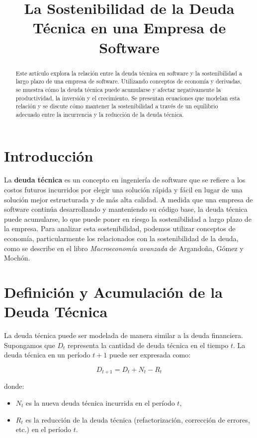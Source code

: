 \documentclass[12pt]{article}
\title{La Sostenibilidad de la Deuda Técnica en una Empresa de Software}
\author{}
\date{}
\begin{document}
\maketitle

\tableofcontents %
\newpage %


\begin{abstract}
Este artículo explora la relación entre la deuda técnica en software y la sostenibilidad a largo plazo de una empresa de software. 
Utilizando conceptos de economía y derivadas, se muestra cómo la deuda técnica puede acumularse 
y afectar negativamente la productividad, la inversión y el crecimiento. 
Se presentan ecuaciones que modelan esta relación y se discute cómo mantener la sostenibilidad 
a través de un equilibrio adecuado entre la incurrencia y la reducción de la deuda técnica.
\end{abstract}

\section{Introducción}
La \textbf{deuda técnica} es un concepto en ingeniería de software que se refiere a los costos futuros incurridos por elegir una solución rápida y fácil en lugar de una solución mejor estructurada y de más alta calidad. A medida que una empresa de software continúa desarrollando y manteniendo su código base, la deuda técnica puede acumularse, lo que puede poner en riesgo la sostenibilidad a largo plazo de la empresa. Para analizar esta sostenibilidad, podemos utilizar conceptos de economía, particularmente los relacionados con la sostenibilidad de la deuda, como se describe en el libro \textit{Macroeconomía avanzada} de Argandoña, Gómez y Mochón.

\section{Definición y Acumulación de la Deuda Técnica}
La deuda técnica puede ser modelada de manera similar a la deuda financiera. Supongamos que \(D_t\) representa la cantidad de deuda técnica en el tiempo \(t\). La deuda técnica en un período \(t+1\) puede ser expresada como:

\[
D_{t+1} = D_t + N_t - R_t
\]

donde:
\begin{itemize}
    \item \(N_t\) es la nueva deuda técnica incurrida en el período \(t\),
    \item \(R_t\) es la reducción de la deuda técnica (refactorización, corrección de errores, etc.) en el período \(t\).
\end{itemize}
\end{document}
